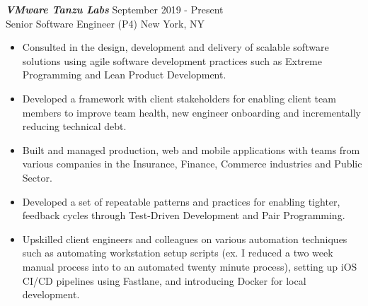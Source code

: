 {\sl \textbf{VMware Tanzu Labs}} \hfill September 2019 - Present \\ Senior Software Engineer (P4) \hfill New York, NY
\begin{itemize}
    \item Consulted in the design, development and delivery of scalable software solutions using agile software development practices such as Extreme Programming and Lean Product Development.
    \item Developed a framework with client stakeholders for enabling client team members to improve team health, new engineer onboarding and incrementally reducing technical debt.
    \item Built and managed production, web and mobile applications with teams from various companies in the Insurance, Finance, Commerce industries and Public Sector.
    \item Developed a set of repeatable patterns and practices for enabling tighter, feedback cycles through Test-Driven Development and Pair Programming.
    \item Upskilled client engineers and colleagues on various automation techniques such as automating workstation setup scripts (ex. I reduced a two week manual process into to an automated twenty minute process), setting up iOS CI/CD pipelines using Fastlane, and introducing Docker for local development.
\end{itemize}
